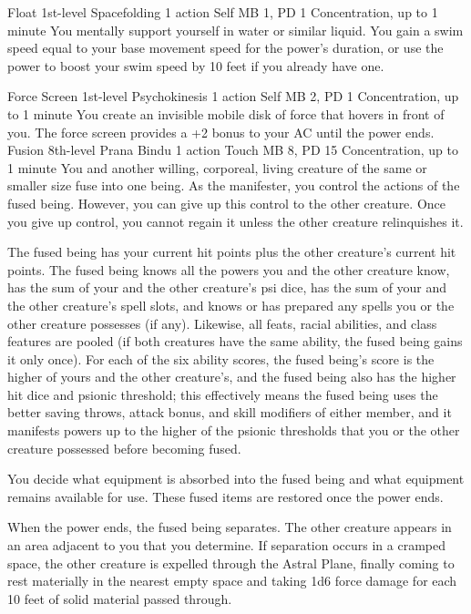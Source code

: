 \DndPowerHeader%
    {Float\label{pwr:float}}
    {1st-level Spacefolding}
    {1 action}
    {Self}
    {MB 1, PD 1}
    {Concentration, up to 1 minute}
You mentally support yourself in water or
similar liquid. You gain a swim speed equal to your base movement
speed for the power's duration, or use the power to boost
your swim speed by 10 feet if you already have one.

\DndPowerHeader%
    {Force Screen\label{pwr:force_screen}}
    {1st-level Psychokinesis}
    {1 action}
    {Self}
    {MB 2, PD 1}
    {Concentration, up to 1 minute}
You create an invisible mobile disk of force
that hovers in front of you. The force screen provides a +2
bonus to your AC until the power ends.
\DndPowerHeader%
    {Fusion\label{pwr:fusion}}
    {8th-level Prana Bindu}
    {1 action}
    {Touch}
    {MB 8, PD 15}
    {Concentration, up to 1 minute}
You and another willing, corporeal, living
creature of the same or smaller size fuse into one being.
As the manifester, you control the actions of the fused being.
However, you can give up this control to the other creature.
Once you give up control, you cannot regain it unless the
other creature relinquishes it.

The fused being has your current hit points plus the other
creature's current hit points. The fused being knows all
the powers you and the other creature know, has the sum of
your and the other creature's psi dice, has the sum of your
and the other creature's spell slots, and knows or has prepared
any spells you or the other creature possesses (if any). Likewise,
all feats, racial abilities, and class features are pooled
(if both creatures have the same ability, the fused being
gains it only once). For each of the six ability scores, the
fused being's score is the higher of yours and the other
creature's, and the fused being also has the higher hit dice
and psionic threshold; this effectively means the fused being
uses the better saving throws, attack bonus, and skill modifiers
of either member, and it manifests powers up to the higher
of the psionic thresholds that you or the other creature possessed
before becoming fused.

You decide what equipment is absorbed into the fused being
and what equipment remains available for use. These fused
items are restored once the power ends.

When the power ends, the fused being separates. The other
creature appears in an area adjacent to you that you determine.
If separation occurs in a cramped space, the other creature
is expelled through the Astral Plane, finally coming to rest
materially in the nearest empty space and taking 1d6 force
damage for each 10 feet of solid material passed through.

